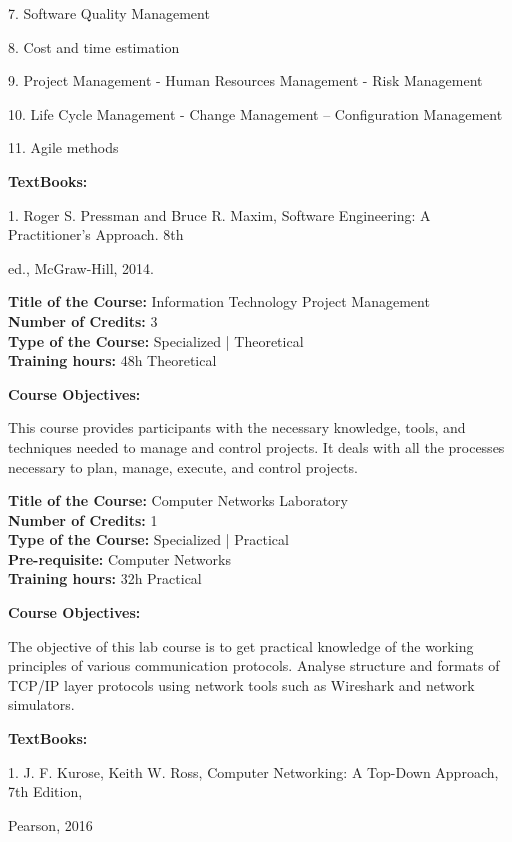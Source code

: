 \documentclass[12pt,a4paper]{article}
\begin{document}
7. Software Quality Management\par
8. Cost and time estimation\par
9. Project Management - Human Resources Management - Risk Management\par
10. Life Cycle Management - Change Management – Configuration Management\par
11. Agile methods\par\vspace{4pt}
\textbf{TextBooks:}\par\vspace{2pt}
1. Roger S. Pressman and Bruce R. Maxim, Software Engineering: A Practitioner’s Approach. 8th\par
ed., McGraw-Hill, 2014.\par
\vspace{4pt}

\newpage
\textbf{Title of the Course:} Information Technology Project Management\\
\textbf{Number of Credits:} 3\\
\textbf{Type of the Course:} Specialized | Theoretical\\
\textbf{Training hours:} 48h Theoretical\par\vspace{4pt}
\textbf{Course Objectives:}\par\vspace{2pt}
This course provides participants with the necessary knowledge, tools, and techniques needed to
manage and control projects. It deals with all the processes necessary to plan, manage, execute,
and control projects.\par\vspace{4pt}

\newpage
\textbf{Title of the Course:} Computer Networks Laboratory\\
\textbf{Number of Credits:} 1\\
\textbf{Type of the Course:} Specialized | Practical\\
\textbf{Pre-requisite:} Computer Networks\\
\textbf{Training hours:} 32h Practical\par\vspace{4pt}
\textbf{Course Objectives:}\par\vspace{2pt}
The objective of this lab course is to get practical knowledge of the working principles of various
communication protocols. Analyse structure and formats of TCP/IP layer protocols using network
tools such as Wireshark and network simulators.\par\vspace{4pt}
\textbf{TextBooks:}\par\vspace{2pt}
1. J. F. Kurose, Keith W. Ross, Computer Networking: A Top-Down Approach, 7th Edition,\par
Pearson, 2016\par
\vspace{4pt}
\end{document}
